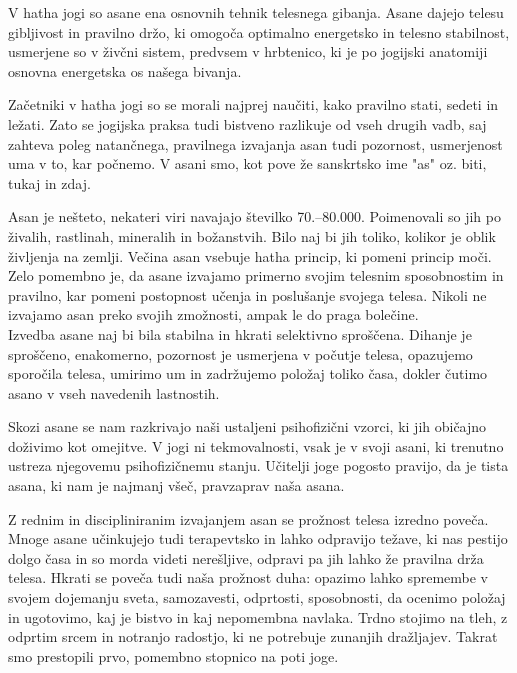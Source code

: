 \documentclass[a4paper, 12pt]{book}
\begin{document}
V hatha jogi so asane ena osnovnih tehnik telesnega gibanja. Asane dajejo telesu gibljivost in pravilno držo, ki omogoča optimalno energetsko in telesno stabilnost, usmerjene so v živčni sistem, predvsem v hrbtenico, ki je po jogijski anatomiji osnovna energetska os našega bivanja.

Začetniki v hatha jogi so se morali najprej naučiti, kako pravilno stati, sedeti in ležati. Zato se jogijska praksa tudi bistveno razlikuje od vseh drugih vadb, saj zahteva poleg natančnega, pravilnega izvajanja asan tudi pozornost, usmerjenost uma v to, kar počnemo. V asani smo, kot pove že sanskrtsko ime "as" oz. biti, tukaj in zdaj.

Asan je nešteto, nekateri viri navajajo številko 70.–80.000. Poimenovali so jih po živalih, rastlinah, mineralih in  božanstvih. Bilo naj bi jih toliko, kolikor je oblik življenja na zemlji. Večina asan vsebuje hatha princip, ki pomeni princip moči. Zelo pomembno je, da asane izvajamo primerno svojim telesnim sposobnostim in pravilno, kar pomeni postopnost učenja in poslušanje svojega telesa. Nikoli ne izvajamo asan preko svojih zmožnosti, ampak le do praga bolečine. \\ 

Izvedba asane naj bi bila stabilna in hkrati selektivno sproščena. Dihanje je sproščeno, enakomerno, pozornost je usmerjena v počutje telesa, opazujemo sporočila telesa, umirimo um in zadržujemo položaj toliko časa, dokler čutimo asano v vseh navedenih lastnostih. 

Skozi asane se nam razkrivajo naši ustaljeni psihofizični vzorci, ki jih običajno doživimo kot omejitve. V jogi ni tekmovalnosti, vsak je v svoji asani, ki trenutno ustreza njegovemu psihofizičnemu stanju. Učitelji joge pogosto pravijo, da je tista asana, ki nam je najmanj všeč, pravzaprav naša asana.

Z rednim in discipliniranim izvajanjem asan se prožnost telesa izredno poveča. Mnoge asane učinkujejo tudi terapevtsko in lahko odpravijo težave, ki nas pestijo dolgo časa in so morda videti nerešljive, odpravi pa jih lahko že pravilna drža telesa. Hkrati se poveča tudi naša prožnost duha: opazimo lahko spremembe v svojem dojemanju sveta, samozavesti, odprtosti, sposobnosti, da ocenimo položaj in ugotovimo, kaj je bistvo in kaj nepomembna navlaka. Trdno stojimo na tleh, z odprtim srcem in notranjo radostjo, ki ne potrebuje zunanjih dražljajev. Takrat smo prestopili prvo, pomembno stopnico na poti joge.~\cite{Asane} \\
\end{document}
